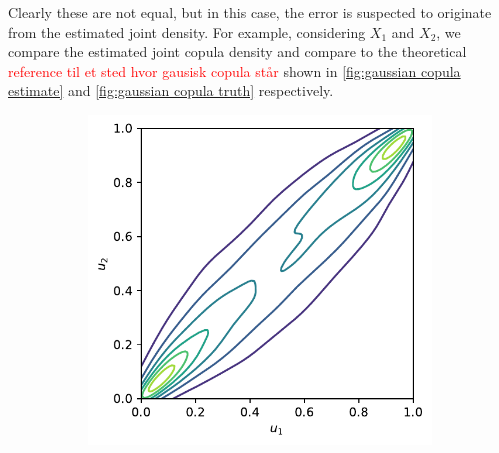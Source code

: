 \documentclass[../Thesis.tex]{subfiles}
\begin{document}
\begin{example}
    Clearly these are not equal, but in this case, the error is suspected to originate from the estimated joint density. For example, considering $X_1$ and $X_2$, we compare the estimated joint copula density and compare to the theoretical \textcolor{red}{reference til et sted hvor gausisk copula står} shown in \autoref{fig:gaussian copula estimate} and \autoref{fig:gaussian copula truth} respectively.
    \begin{figure}[H]
        \centering
        \begin{subfigure}[t]{0.45\linewidth}
            \centering
            \includegraphics[width = \linewidth]{figures/ND examples/Gaussian copula sample contour.pdf}
            \caption{}
        \end{subfigure}%
        ~
        \begin{subfigure}[t]{0.5\linewidth}

\end{subfigure}
\end{figure}
\end{example}
\end{document}
